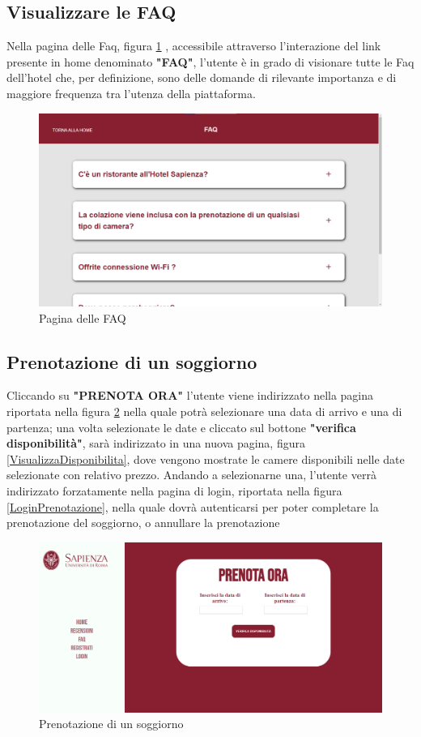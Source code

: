 \documentclass [a4paper, 12pt]{book}
\begin{document}
\medskip

\subsection{Visualizzare le FAQ}
Nella pagina delle Faq, figura \ref{FaqVisitatore} , accessibile attraverso l'interazione del link presente in home denominato \textbf{"FAQ"}, l'utente è in grado di visionare tutte le Faq dell'hotel che, per definizione, sono delle domande di rilevante importanza e di maggiore frequenza tra l'utenza della piattaforma.
\begin{figure}[!ht]
\centering
\includegraphics[scale=0.29]{FaqVisitatore.png}
\caption{Pagina delle FAQ}
\label{FaqVisitatore}
\end{figure}

\subsection{Prenotazione di un soggiorno}
Cliccando su \textbf{"PRENOTA ORA"} l'utente viene indirizzato nella pagina riportata nella figura \ref{PrenotaOra} nella quale potrà selezionare una data di arrivo e una di partenza; una volta selezionate le date e cliccato sul bottone \textbf{"verifica disponibilità"}, sarà indirizzato in una nuova pagina, figura \ref{VisualizzaDisponibilita}, dove vengono mostrate le camere disponibili nelle date selezionate con relativo prezzo. Andando a selezionarne una, l'utente verrà indirizzato forzatamente nella pagina di login, riportata nella figura \ref{LoginPrenotazione}, nella quale dovrà autenticarsi per poter completare la prenotazione del soggiorno, o annullare la prenotazione
\begin{figure}[h]
\centering
\includegraphics[scale=0.3]{PrenotaOra.png}
\caption{Prenotazione di un soggiorno}
\label{PrenotaOra}
\end{figure}
\end{document}

